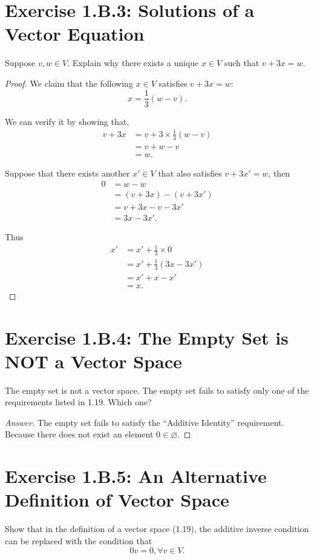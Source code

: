 \section{Exercise 1.B.3: Solutions of a Vector Equation}
Suppose $v,w\in V$. Explain why there exists a unique $x\in V$ such that $v+3x=w$.
\begin{proof}
We claim that the following $x\in V$ satisfies $v+3x=w$:
\[
x=\frac{1}{3}(w-v).
\]

We can verify it by showing that,
\begin{equation*}
\begin{split}
v+3x&=v+3\times\frac{1}{3}(w-v)\\
&=v+w-v\\
&=w.
\end{split}
\end{equation*}

Suppose that there exists another $x'\in V$ that also satisfies $v+3x'=w$, then
\begin{equation*}
\begin{split}
0&=w-w\\
&=(v+3x)-(v+3x')\\
&=v+3x-v-3x'\\
&=3x-3x'.
\end{split}
\end{equation*}

Thus
\begin{equation*}
\begin{split}
x'&=x'+\frac{1}{3}\times0\\
&=x'+\frac{1}{3}(3x-3x')\\
&=x'+x-x'\\
&=x.
\end{split}
\end{equation*}
\end{proof}

\section{Exercise 1.B.4: The Empty Set is NOT a Vector Space}
The empty set is not a vector space. The empty set fails to satisfy only one of the requirements listed in 1.19. Which one?
\begin{proof}[Answer]
The empty set fails to satisfy the ``Additive Identity'' requirement. Because there does not exist an element $0\in\varnothing$.
\end{proof}

\section{Exercise 1.B.5: An Alternative Definition of Vector Space}
Show that in the definition of a vector space (1.19), the additive inverse condition can be replaced with the condition that
\[
0v=0, \forall v\in V.
\]

